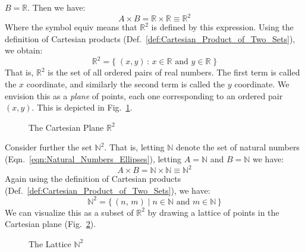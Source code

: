         $B=\mathbb{R}$. Then we have:
        \begin{equation}
            A\times{B}=\mathbb{R}\times\mathbb{R}\equiv\mathbb{R}^{2}
        \end{equation}
        Where the symbol \gls{equiv} means that $\mathbb{R}^{2}$ is defined by
        this expression. Using the definition of Cartesian products
        (Def.~\ref{def:Cartesian_Product_of_Two_Sets}), we obtain:
        \begin{equation}
            \mathbb{R}^{2}=\{\;(x,y)\,:\,x\in\mathbb{R}
                               \textrm{ and }y\in\mathbb{R}\;\}
        \end{equation}
        That is, $\mathbb{R}^{2}$ is the set of all ordered pairs of real
        numbers. The first term is called the $x$ coordinate, and similarly the
        second term is called the $y$ coordinate. We envision this as a
        \textit{plane} of points, each one corresponding to an ordered pair
        $(x,y)$. This is depicted in Fig.~\ref{fig:Cartesian_Plane}.
        \begin{figure}[H]
            \centering
            
            \caption{The Cartesian Plane $\mathbb{R}^{2}$}
            \label{fig:Cartesian_Plane}
        \end{figure}
        Consider further the set $\mathbb{N}^{2}$. That is, letting
        $\mathbb{N}$ denote the set of natural numbers
        (Eqn.~\ref{eqn:Natural_Numbers_Ellipses}), letting $A=\mathbb{N}$ and
        $B=\mathbb{N}$ we have:
        \begin{equation}
            A\times{B}=\mathbb{N}\times\mathbb{N}\equiv\mathbb{N}^{2}
        \end{equation}
        Again using the definition of Cartesian products
        (Def.~\ref{def:Cartesian_Product_of_Two_Sets}), we have:
        \begin{equation}
            \mathbb{N}^{2}=
            \{\,(n,\,m)\;|\;n\in\mathbb{N}\textrm{ and }m\in\mathbb{N}\,\}
        \end{equation}
        We can visualize this as a subset of $\mathbb{R}^{2}$ by drawing a
        lattice of points in the Cartesian plane
        (Fig.~\ref{fig:Lattice_Cart_Prod_of_N_with_N}).
        \begin{figure}[H]
            \centering
            
            \caption{The Lattice $\mathbb{N}^{2}$}
            \label{fig:Lattice_Cart_Prod_of_N_with_N}
        \end{figure}
